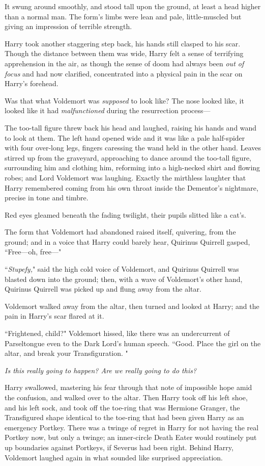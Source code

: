 It swung around smoothly, and stood tall upon the ground, at least a head higher than a normal man. The form's limbs were lean and pale, little-muscled but giving an impression of terrible strength.

Harry took another staggering step back, his hands still clasped to his scar. Though the distance between them was wide, Harry felt a sense of terrifying apprehension in the air, as though the sense of doom had always been \emph{out of focus} and had now clarified, concentrated into a physical pain in the scar on Harry's forehead.

Was that what Voldemort was \emph{supposed} to look like? The nose looked like, it looked like it had \emph{malfunctioned} during the resurrection process—

The too-tall figure threw back his head and laughed, raising his hands and wand to look at them. The left hand opened wide and it was like a pale half-spider with four over-long legs, fingers caressing the wand held in the other hand. Leaves stirred up from the graveyard, approaching to dance around the too-tall figure, surrounding him and clothing him, reforming into a high-necked shirt and flowing robes; and Lord Voldemort was laughing. Exactly the mirthless laughter that Harry remembered coming from his own throat inside the Dementor's nightmare, precise in tone and timbre.

Red eyes gleamed beneath the fading twilight, their pupils slitted like a cat's.

The form that Voldemort had abandoned raised itself, quivering, from the ground; and in a voice that Harry could barely hear, Quirinus Quirrell gasped, ``Free—oh, free—"

``\emph{Stupefy,}" said the high cold voice of Voldemort, and Quirinus Quirrell was blasted down into the ground; then, with a wave of Voldemort's other hand, Quirinus Quirrell was picked up and flung away from the altar.

Voldemort walked away from the altar, then turned and looked at Harry; and the pain in Harry's scar flared at it.

``Frightened, child?" Voldemort hissed, like there was an undercurrent of Parseltongue even to the Dark Lord's human speech. ``Good. Place the girl on the altar, and break your Transfiguration. "

\emph{Is this really going to happen? Are we really going to do this?}

Harry swallowed, mastering his fear through that note of impossible hope amid the confusion, and walked over to the altar. Then Harry took off his left shoe, and his left sock, and took off the toe-ring that was Hermione Granger, the Transfigured shape identical to the toe-ring that had been given Harry as an emergency Portkey. There was a twinge of regret in Harry for not having the real Portkey now, but only a twinge; an inner-circle Death Eater would routinely put up boundaries against Portkeys, if Severus had been right. Behind Harry, Voldemort laughed again in what sounded like surprised appreciation.

